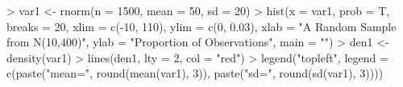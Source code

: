 \begin{Schunk}
\begin{Sinput}
> var1 <- rnorm(n = 1500, mean = 50, sd = 20)
> hist(x = var1, prob = T, breaks = 20, xlim = c(-10, 
      110), ylim = c(0, 0.03), xlab = "A Random Sample from N(10,400)", 
      ylab = "Proportion of Observations", main = "")
> den1 <- density(var1)
> lines(den1, lty = 2, col = "red")
> legend("topleft", legend = c(paste("mean=", round(mean(var1), 
      3)), paste("sd=", round(sd(var1), 3))))
\end{Sinput}
\end{Schunk}
